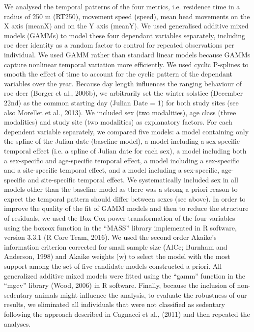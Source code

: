 \documentclass[a4paper,11pt]{article}
\begin{document}
We analysed the temporal patterns of the four metrics, i.e. residence time in a radius of 250 m (RT250), movement speed (speed), mean head movements on the X axis (meanX) and on the Y axis (meanY). We used generalised additive mixed models (GAMMs) to model these four dependant variables separately, including roe deer identity as a random factor to control for repeated observations per individual. We used GAMM rather than standard linear models because GAMMs capture nonlinear temporal variation more efficiently. We used cyclic P-splines to smooth the effect of time to account for the cyclic pattern of the dependant variables over the year. Because day length influences the ranging behaviour of roe deer (Borger et al., 2006b), we arbitrarily set the winter solstice (December 22nd) as the common starting day (Julian Date = 1) for both study sites (see also Morellet et al., 2013). We included sex (two modalities), age class (three modalities) and study site (two modalities) as explanatory factors. For each dependent variable separately, we compared five models: a model containing only the spline of the Julian date (baseline model), a model including a sex-specific temporal effect (i.e. a spline of Julian date for each sex), a model including both a sex-specific and age-specific temporal effect, a model including a sex-specific and a site-specific temporal effect, and a model including a sex-specific, age-specific and site-specific temporal effect. We systematically included sex in all models other than the baseline model as there was a strong a priori reason to expect the temporal pattern should differ between sexes (see above). In order to improve the quality of the fit of GAMM models and then to reduce the structure of residuals, we used the Box-Cox power transformation of the four variables using the boxcox function in the “MASS” library implemented in R software, version 3.3.1 (R Core Team, 2016). We used the second order Akaike’s information criterion corrected for small sample size (AICc; Burnham and Anderson, 1998) and Akaike weights (w) to select the model with the most support among the set of five candidate models constructed a priori. All generalized additive mixed models were fitted using the “gamm” function in the “mgcv” library (Wood, 2006) in R software. Finally, because the inclusion of non-sedentary animals might influence the analysis, to evaluate the robustness of our results, we eliminated all individuals that were not classified as sedentary following the approach described in Cagnacci et al., (2011) and then repeated the analyses. 
\end{document}
